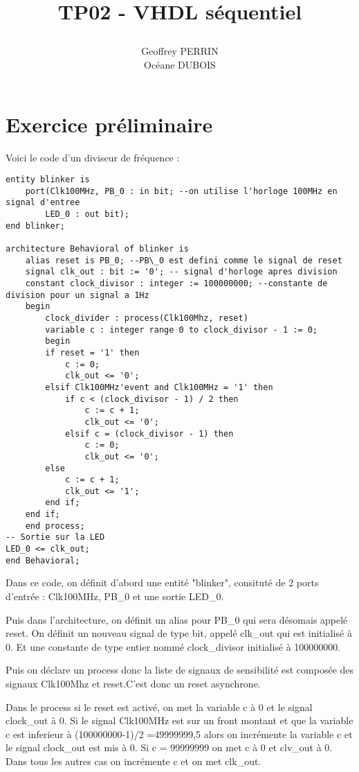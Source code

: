 \documentclass[11pt]{report}
\title{\textbf{TP02 - VHDL séquentiel}
\author{Geoffrey PERRIN \\ Océane DUBOIS\\}
\date{}}
\begin{document}
\maketitle

\newpage

\section{Exercice préliminaire}

Voici le code d'un diviseur de fréquence : 
\begin{lstlisting}
entity blinker is
	port(Clk100MHz, PB_0 : in bit; --on utilise l'horloge 100MHz en signal d'entree
		LED_0 : out bit);
end blinker;

architecture Behavioral of blinker is
	alias reset is PB_0; --PB\_0 est defini comme le signal de reset
	signal clk_out : bit := '0'; -- signal d'horloge apres division
	constant clock_divisor : integer := 100000000; --constante de division pour un signal a 1Hz
	begin
		clock_divider : process(Clk100Mhz, reset)
		variable c : integer range 0 to clock_divisor - 1 := 0;
		begin
		if reset = '1' then
			c := 0;
			clk_out <= '0';
		elsif Clk100MHz'event and Clk100MHz = '1' then
			if c < (clock_divisor - 1) / 2 then
				c := c + 1;
				clk_out <= '0';
			elsif c = (clock_divisor - 1) then
				c := 0;
				clk_out <= '0';
		else
			c := c + 1;
			clk_out <= '1';
		end if;
	end if;
	end process;
-- Sortie sur la LED
LED_0 <= clk_out;
end Behavioral;
\end{lstlisting}

Dans ce code, on définit d'abord une entité "blinker", consituté de 2 ports d'entrée : Clk100MHz, PB\_0 et une sortie LED\_0.

Puis dans l'architecture, on définit un alias pour PB\_0 qui sera désomais appelé reset. On définit un nouveau signal de type bit, appelé clk\_out qui est initialisé à 0.  Et une constante de type entier nommé clock\_divisor initialisé à 100000000. 

Puis on déclare un process donc la liste de signaux de sensibilité est composée des signaux Clk100Mhz et reset.C'est donc un reset asynchrone.  

Dans le process si le reset est activé, on met la variable c à 0 et le signal clock\_out à 0. Si le signal Clk100MHz est sur un front montant et que la variable c est inferieur à (100000000-1)/2 =49999999,5 alors on incrémente la variable c et le signal clock\_out est mis à 0. Si c = 99999999 on met c à 0 et clv\_out à 0. Dans tous les autres cas on incrémente c et on met clk\_out.
\end{document}
